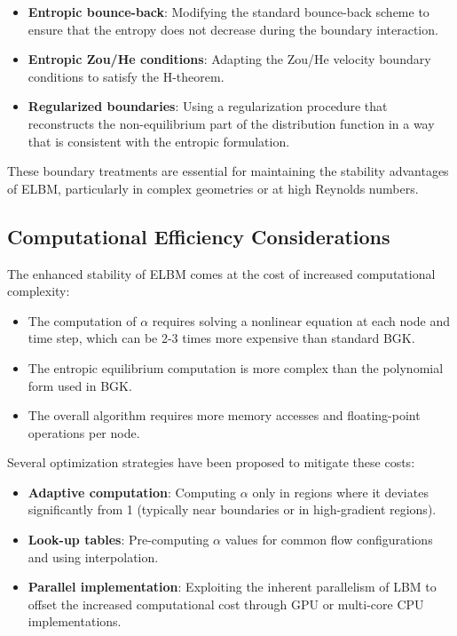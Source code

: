 \documentclass[12pt,a4paper]{article}
\begin{document}
\begin{itemize}
    \item \textbf{Entropic bounce-back}: Modifying the standard bounce-back scheme to ensure that the entropy does not decrease during the boundary interaction.

    \item \textbf{Entropic Zou/He conditions}: Adapting the Zou/He velocity boundary conditions to satisfy the H-theorem.

    \item \textbf{Regularized boundaries}: Using a regularization procedure that reconstructs the non-equilibrium part of the distribution function in a way that is consistent with the entropic formulation.
\end{itemize}

These boundary treatments are essential for maintaining the stability advantages of ELBM, particularly in complex geometries or at high Reynolds numbers.

\subsection{Computational Efficiency Considerations}

The enhanced stability of ELBM comes at the cost of increased computational complexity:

\begin{itemize}
    \item The computation of $\alpha$ requires solving a nonlinear equation at each node and time step, which can be 2-3 times more expensive than standard BGK.

    \item The entropic equilibrium computation is more complex than the polynomial form used in BGK.

    \item The overall algorithm requires more memory accesses and floating-point operations per node.
\end{itemize}

Several optimization strategies have been proposed to mitigate these costs:

\begin{itemize}
    \item \textbf{Adaptive computation}: Computing $\alpha$ only in regions where it deviates significantly from 1 (typically near boundaries or in high-gradient regions).

    \item \textbf{Look-up tables}: Pre-computing $\alpha$ values for common flow configurations and using interpolation.

    \item \textbf{Parallel implementation}: Exploiting the inherent parallelism of LBM to offset the increased computational cost through GPU or multi-core CPU implementations.
\end{itemize}
\end{document}
